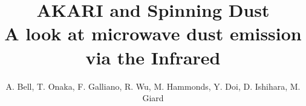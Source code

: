 \documentclass[preprint2,longabstract]{aastex}
\begin{document}

\title{AKARI and Spinning Dust\\
A look at microwave dust emission via the Infrared}



\author{A. Bell, T. Onaka, F. Galliano, R. Wu, M. Hammonds, Y. Doi, D. Ishihara, M. Giard}






\end{document}
